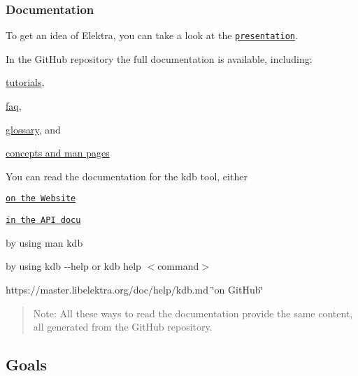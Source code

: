 \subsubsection*{Documentation}

To get an idea of Elektra, you can take a look at the \href{https://www.libelektra.org/ftp/elektra/presentations/2016/FOSDEM/fosdem.odp}{\tt presentation}.

In the Git\+Hub repository the full documentation is available, including\+:


\begin{DoxyItemize}
\item \hyperlink{md_doc_tutorials_README_doc_tutorials_README_md}{tutorials},
\item \hyperlink{doc_help_elektra-faq_md}{faq},
\item \hyperlink{doc_help_elektra-glossary_md}{glossary}, and
\item \hyperlink{doc_help_elektra-introduction_md}{concepts and man pages}
\end{DoxyItemize}

You can read the documentation for the kdb tool, either


\begin{DoxyItemize}
\item \href{https://www.libelektra.org}{\tt on the Website}
\item \href{https://doc.libelektra.org/api/latest/html/md_doc_help_kdb.html}{\tt in the A\+PI docu}
\item by using {\ttfamily man kdb}
\item by using {\ttfamily kdb -\/-\/help} or {\ttfamily kdb help $<$command$>$}
\item https\+://master.libelektra.\+org/doc/help/kdb.md \char`\"{}on Git\+Hub\char`\"{}
\end{DoxyItemize}

\begin{quote}
Note\+: All these ways to read the documentation provide the same content, all generated from the Git\+Hub repository. \end{quote}


\subsection*{Goals}


